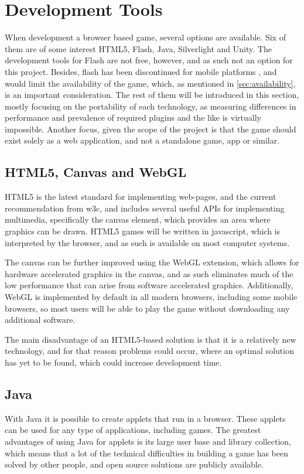\section{Development Tools}

\label{sec:tools}

When development a browser based game, several options are available. Six of them are of some interest
HTML5, Flash, Java, Silverlight and Unity. The development tools for Flash are not free, \cite{adobe13} however,
and as such not an option for this project. Besides, flash has been discontinued for mobile platforms \cite{adobe12}, and would limit the availability of the game,
which, as mentioned in \autoref{sec:availability}, is an important consideration. The rest of them will be introduced in this section, mostly focusing on the portability
of each technology, as measuring differences in performance and prevalence of required plugins and the like is virtually impossible.
Another focus, given the scope of the project is that the game should exist solely as a web application, and not a standalone game, app or similar.

\subsection{HTML5, Canvas and WebGL}
HTML5 is the latest standard for implementing web-pages, and the current recommendation from \ac{w3c}, \cite{html513} and includes several
useful APIs for implementing multimedia, specifically the canvas element, which provides an area where graphics can be drawn.
HTML5 games will be written in javascript, which is interpreted by the browser, and as such is available on most computer systems.

The canvas can be further improved using the WebGL extension,\cite{khronos13} which allows for hardware accelerated graphics in the canvas,
and as such eliminates much of the low performance that can arise from software accelerated graphics.
Additionally, WebGL is implemented by default in all modern browsers, including some mobile browsers, so most users will be able to play the game
without downloading any additional software.

The main disadvantage of an HTML5-based solution is that it is a relatively new technology, and for that reason problems could occur, where an optimal solution has yet to be found, which could increase development time.

\subsection{Java}
With Java it is possible to create applets that run in a browser.\cite{java13} These applets can be used for any type of applications,
including games. The greatest advantages of using Java for applets is its large user base and library collection, which means that a lot of the technical difficulties in building a game has been solved by other people,
and open source solutions are publicly available.


